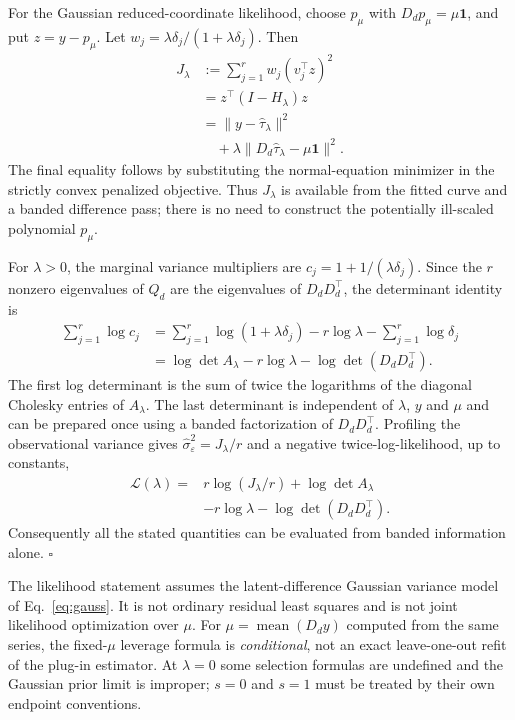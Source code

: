 For the Gaussian reduced-coordinate likelihood,
choose $p_\mu$ with $D_dp_\mu=\mu\mathbf1$, and put
$z=y-p_\mu$. Let $w_j=\lambda\delta_j/(1+\lambda\delta_j)$.
Then
\begin{equation}\label{eq:theory_profile_quad}
\begin{aligned}
J_\lambda
&:=\sum_{j=1}^r w_j(v_j^\top z)^2\\
&=z^\top(I-H_\lambda)z\\
&=\|y-\widehat\tau_\lambda\|^2\\
&\quad+\lambda\|D_d\widehat\tau_\lambda-\mu\mathbf1\|^2.
\end{aligned}
\end{equation}
The final equality follows by substituting the
normal-equation minimizer in the strictly convex
penalized objective. Thus $J_\lambda$ is available
from the fitted curve and a banded difference pass;
there is no need to construct the potentially
ill-scaled polynomial $p_\mu$.

For $\lambda>0$, the marginal variance multipliers are
$c_j=1+1/(\lambda\delta_j)$. Since the $r$ nonzero
eigenvalues of $Q_d$ are the eigenvalues of
$D_dD_d^\top$, the determinant identity is
\begin{equation}\label{eq:theory_logdet}
\begin{aligned}
\sum_{j=1}^r\log c_j
&=\sum_{j=1}^r\log(1+\lambda\delta_j)
-r\log\lambda-\sum_{j=1}^r\log\delta_j\\
&=\log\det A_\lambda-r\log\lambda
-\log\det(D_dD_d^\top).
\end{aligned}
\end{equation}
The first log determinant is the sum of twice the
logarithms of the diagonal Cholesky entries
of $A_\lambda$. The last determinant is independent
of $\lambda$, $y$ and $\mu$ and can be prepared
once using a banded factorization of
$D_dD_d^\top$. Profiling the observational variance
gives $\widehat\sigma^2_\varepsilon=J_\lambda/r$
and a negative twice-log-likelihood, up to constants,
\begin{equation}\label{eq:theory_mle}
\begin{aligned}
\mathcal L(\lambda)
={}&r\log(J_\lambda/r)+\log\det A_\lambda\\
&-r\log\lambda-\log\det(D_dD_d^\top).
\end{aligned}
\end{equation}
Consequently all the stated quantities can be
evaluated from banded information alone.
\hfill$\square$

The likelihood statement assumes the latent-difference
Gaussian variance model of Eq.~\eqref{eq:gauss}.
It is not ordinary residual least squares and is
not joint likelihood optimization over $\mu$.
For $\mu=\operatorname{mean}(D_dy)$ computed from the
same series, the fixed-$\mu$ leverage formula is
\emph{conditional}, not an exact leave-one-out
refit of the plug-in estimator. At $\lambda=0$
some selection formulas are undefined and the
Gaussian prior limit is improper; $s=0$ and $s=1$
must be treated by their own endpoint conventions.


